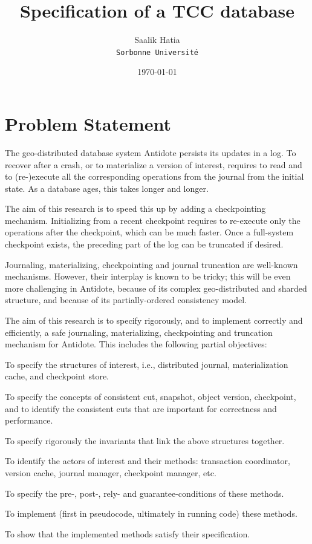 \documentclass[11pt]{article}
\begin{document}
\author{
  Saalik Hatia\\
  \texttt{Sorbonne Université}
  }
\title{Specification of a TCC database}


\date\today
\maketitle



\section{Problem Statement}
\label{sec:problem-statement}
The geo-distributed database system Antidote persists its
updates in a log.
To recover after a crash, or to materialize a version of interest,
requires to read and to (re-)execute all the corresponding operations
from the journal from the initial state.
As a database ages, this takes longer and longer.

The aim of this research is to speed this up by adding a checkpointing
mechanism.
Initializing from a recent checkpoint requires to re-execute only
the operations after the checkpoint, which can be much faster.
Once a full-system checkpoint exists, the preceding part of the log can
be truncated if desired.

Journaling, materializing, checkpointing and journal truncation are
well-known mechanisms.
However, their interplay is known to be tricky; this will be even more
challenging in Antidote, because of its complex geo-distributed and
sharded structure, and because of its partially-ordered consistency
model.

The aim of this research is to specify rigorously, and to implement
correctly and efficiently, a safe journaling, materializing,
checkpointing and truncation mechanism for Antidote.
This includes the following partial objectives:
\begin{compactitem}
\item
  To specify the structures of interest, i.e., distributed journal,
  materialization cache, and checkpoint store.
\item
  To specify the concepts of consistent cut, snapshot, object version,
  checkpoint, and to identify the consistent cuts that are important for
  correctness and performance.
\item
  To specify rigorously the invariants that link the above structures
  together.
\item
  To identify the actors of interest and their methods: transaction
  coordinator, version cache, journal manager, checkpoint manager, etc.
\item
  To specify the pre-, post-, rely- and guarantee-conditions of these
  methods.
\item
  To implement (first in pseudocode, ultimately in running code) these
  methods.
\item
  To show that the implemented methods satisfy their specification.
\end{compactitem}
\end{document}
